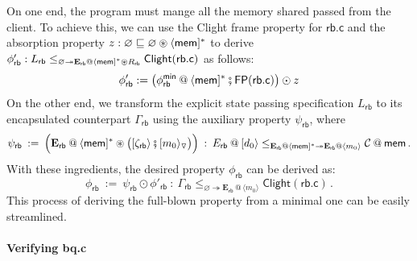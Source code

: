 \documentclass[acmsmall,screen,review,anonymous,nonacm]{acmart}
\newcommand{\kw}[1]{\ensuremath{ \mathsf{#1} }}
\newcommand{\vcomp}{\fatsemi}
\newcommand{\sepconj}{\oast}
\begin{document}
On one end,
the program must mange
all the memory shared passed
from the client.
To achieve this,
we can use the Clight frame property for $\kw{rb.c}$
and the absorption property
$z : \varnothing \sqsubseteq \varnothing \sepconj \langle\kw{mem}]^*$
to derive
$\phi'_\kw{rb} : L_\kw{rb} \le_{\varnothing
  \twoheadrightarrow \mathbf{E}_\kw{rb} @ \langle\kw{mem}{]}^* \sepconj R_\kw{rb}}
\kw{Clight}(\kw{rb.c})
$ as follows:
\[
  \phi'_\kw{rb} :=
  \big(
    \phi_\kw{rb}^\kw{min} \mathbin@ \langle \kw{mem} ]^*
    \vcomp
    \kw{FP}(\kw{rb.c})
    \big) \odot z
\]%
On the other end,
we transform
the explicit state passing specification
$L_\kw{rb}$
to its encapsulated counterpart
$\Gamma_\kw{rb}$
using the auxiliary property
$\psi_\kw{rb}$,
where
\[
  \psi_\kw{rb} \: := \:
  \Big(
      \mathbf{E}_\kw{rb} \mathbin@
      \langle \kw{mem} ]^* \sepconj
      \big(
        [\zeta_\kw{rb} \rangle \vcomp [m_0\rangle_\triangledown
      \big)
      \Big)
      \: : \:
      E_\kw{rb} \mathbin@ [d_0\rangle
      \le_{\mathbf{E}_\kw{rb} \mathbin@ \langle \kw{mem}]^* \twoheadrightarrow
        \mathbf{E}_\kw{rb} \mathbin@ \langle m_0 \rangle}
      \mathcal{C} \mathbin@ \kw{mem}
  \,.
\]
With these ingredients,
the desired property $\phi_\kw{rb}$
can be derived as:
\[
  \phi_\kw{rb} \: := \:
    \psi_\kw{rb} \odot \phi'_\kw{rb}
  \: : \:
  \Gamma_\kw{rb}
    \le_{\varnothing \twoheadrightarrow
      \mathbf{E}_\kw{rb} \mathbin@
        \langle m_0 \rangle}
    \kw{Clight}(\kw{rb.c})
  \,.
\]
This process of
deriving the full-blown property
from a minimal one
can be easily streamlined.

\paragraph{Verifying bq.c}
\end{document}

